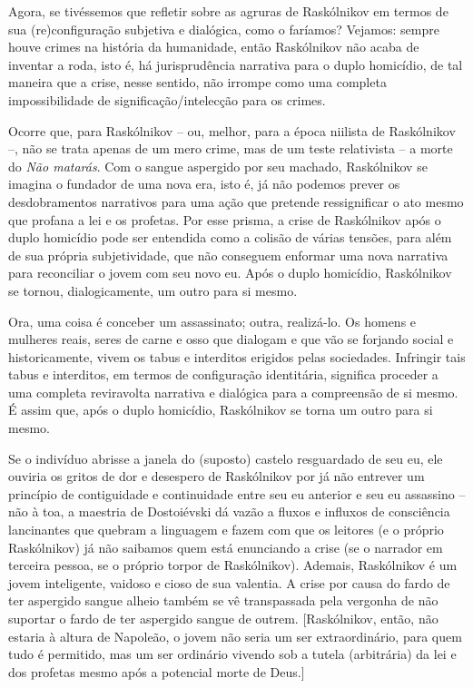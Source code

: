 Agora, se tivéssemos que refletir sobre as agruras de Raskólnikov em
termos de sua (re)configuração subjetiva e dialógica, como o faríamos?
Vejamos: sempre houve crimes na história da humanidade, então
Raskólnikov não acaba de inventar a roda, isto é, há jurisprudência
narrativa para o duplo homicídio, de tal maneira que a crise, nesse
sentido, não irrompe como uma completa impossibilidade de
significação/intelecção para os crimes.

Ocorre que, para Raskólnikov -- ou, melhor, para a época niilista de
Raskólnikov --, não se trata apenas de um mero crime, mas de um teste
relativista -- a morte do \emph{Não matarás}. Com o sangue aspergido por
seu machado, Raskólnikov se imagina o fundador de uma nova era, isto é,
já não podemos prever os desdobramentos narrativos para uma ação que
pretende ressignificar o ato mesmo que profana a lei e os profetas. Por
esse prisma, a crise de Raskólnikov após o duplo homicídio pode ser
entendida como a colisão de várias tensões, para além de sua própria
subjetividade, que não conseguem enformar uma nova narrativa para
reconciliar o jovem com seu novo eu. Após o duplo homicídio, Raskólnikov
se tornou, dialogicamente, um outro para si mesmo.

Ora, uma coisa é conceber um assassinato; outra, realizá-lo. Os homens e
mulheres reais, seres de carne e osso que dialogam e que vão se forjando
social e historicamente, vivem os tabus e interditos erigidos pelas
sociedades. Infringir tais tabus e interditos, em termos de configuração
identitária, significa proceder a uma completa reviravolta narrativa e
dialógica para a compreensão de si mesmo. É assim que, após o duplo
homicídio, Raskólnikov se torna um outro para si mesmo.

Se o indivíduo abrisse a janela do (suposto) castelo resguardado de seu
eu, ele ouviria os gritos de dor e desespero de Raskólnikov por já não
entrever um princípio de contiguidade e continuidade entre seu eu
anterior e seu eu assassino -- não à toa, a maestria de Dostoiévski dá
vazão a fluxos e influxos de consciência lancinantes que quebram a
linguagem e fazem com que os leitores (e o próprio Raskólnikov) já não
saibamos quem está enunciando a crise (se o narrador em terceira pessoa,
se o próprio torpor de Raskólnikov). Ademais, Raskólnikov é um jovem
inteligente, vaidoso e cioso de sua valentia. A crise por causa do fardo
de ter aspergido sangue alheio também se vê transpassada pela vergonha
de não suportar o fardo de ter aspergido sangue de outrem.
{[}Raskólnikov, então, não estaria à altura de Napoleão, o jovem não
seria um ser extraordinário, para quem tudo é permitido, mas um ser
ordinário vivendo sob a tutela (arbitrária) da lei e dos profetas mesmo
após a potencial morte de Deus.{]}

